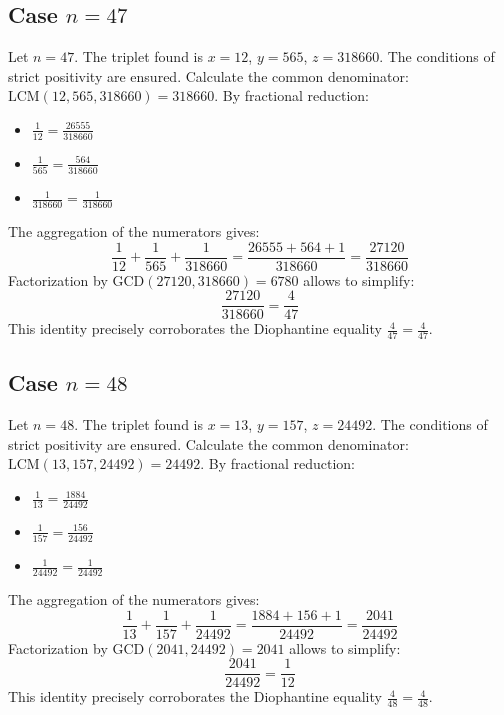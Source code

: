 \documentclass[11pt,a4paper]{article}
\begin{document}
\subsection{Case $n = 47$}
Let $n = 47$. The triplet found is $x = 12$, $y = 565$, $z = 318660$.
The conditions of strict positivity are ensured.
Calculate the common denominator: $\text{LCM}(12, 565, 318660) = 318660$.
By fractional reduction:
\begin{itemize}
    \item $\frac{1}{12} = \frac{26555}{318660}$
    \item $\frac{1}{565} = \frac{564}{318660}$
    \item $\frac{1}{318660} = \frac{1}{318660}$
\end{itemize}
The aggregation of the numerators gives:
$$ \frac{1}{12} + \frac{1}{565} + \frac{1}{318660} = \frac{26555 + 564 + 1}{318660} = \frac{27120}{318660} $$
Factorization by $\text{GCD}(27120, 318660) = 6780$ allows to simplify:
$$ \frac{27120}{318660} = \frac{4}{47} $$
This identity precisely corroborates the Diophantine equality $\frac{4}{47} = \frac{4}{47}$.

\subsection{Case $n = 48$}
Let $n = 48$. The triplet found is $x = 13$, $y = 157$, $z = 24492$.
The conditions of strict positivity are ensured.
Calculate the common denominator: $\text{LCM}(13, 157, 24492) = 24492$.
By fractional reduction:
\begin{itemize}
    \item $\frac{1}{13} = \frac{1884}{24492}$
    \item $\frac{1}{157} = \frac{156}{24492}$
    \item $\frac{1}{24492} = \frac{1}{24492}$
\end{itemize}
The aggregation of the numerators gives:
$$ \frac{1}{13} + \frac{1}{157} + \frac{1}{24492} = \frac{1884 + 156 + 1}{24492} = \frac{2041}{24492} $$
Factorization by $\text{GCD}(2041, 24492) = 2041$ allows to simplify:
$$ \frac{2041}{24492} = \frac{1}{12} $$
This identity precisely corroborates the Diophantine equality $\frac{4}{48} = \frac{4}{48}$.
\end{document}
